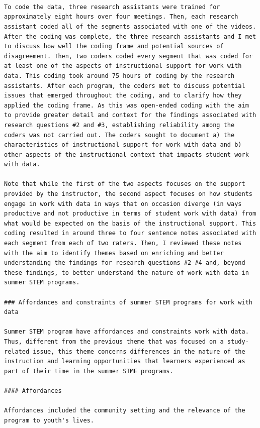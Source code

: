 \documentclass[]{book}
\theoremstyle{definition}
\theoremstyle{definition}
\theoremstyle{definition}
\theoremstyle{remark}
\begin{document}
\begin{verbatim}



To code the data, three research assistants were trained for approximately eight hours over four meetings. Then, each research assistant coded all of the segments associated with one of the videos. After the coding was complete, the three research assistants and I met to discuss how well the coding frame and potential sources of disagreement. Then, two coders coded every segment that was coded for at least one of the aspects of instructional support for work with data. This coding took around 75 hours of coding by the research assistants. After each program, the coders met to discuss potential issues that emerged throughout the coding, and to clarify how they applied the coding frame. As this was open-ended coding with the aim to provide greater detail and context for the findings associated with research questions #2 and #3, establishing reliability among the coders was not carried out. The coders sought to document a) the characteristics of instructional support for work with data and b) other aspects of the instructional context that impacts student work with data.

Note that while the first of the two aspects focuses on the support provided by the instructor, the second aspect focuses on how students engage in work with data in ways that on occasion diverge (in ways productive and not productive in terms of student work with data) from what would be expected on the basis of the instructional support. This coding resulted in around three to four sentence notes associated with each segment from each of two raters. Then, I reviewed these notes with the aim to identify themes based on enriching and better understanding the findings for research questions #2-#4 and, beyond these findings, to better understand the nature of work with data in summer STEM programs.

### Affordances and constraints of summer STEM programs for work with data

Summer STEM program have affordances and constraints work with data. Thus, different from the previous theme that was focused on a study-related issue, this theme concerns differences in the nature of the instruction and learning opportunities that learners experienced as part of their time in the summer STME programs.

#### Affordances

Affordances included the community setting and the relevance of the program to youth's lives.


\end{verbatim}
\end{document}
